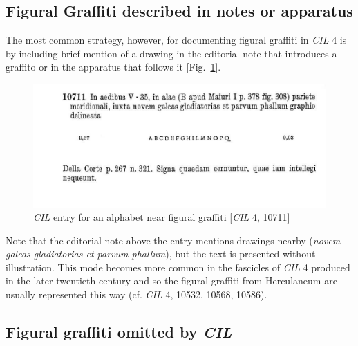 \documentclass[amsthm,ebook]{saparticle}
\begin{document}
\subsection{Figural Graffiti described in notes or apparatus}


\noindent The most common strategy, however, for documenting figural graffiti in \emph{CIL} 4 is by including brief mention of a drawing
in the editorial note that introduces a graffito or in the apparatus that follows it [Fig.~\ref{fig:3}].  



\begin{figure}[!bp]
\centering
 \includegraphics[width=\columnwidth]{EAGLE2016BenefielSypniewski-img003.jpg}
\caption{\emph{CIL} entry for an alphabet near figural graffiti [\emph{CIL} 4, 10711]}
\label{fig:3}
\end{figure}
 


Note that the editorial note above the entry mentions drawings nearby (\emph{novem galeas gladiatorias et parvum phallum}), but
the text is presented without illustration. This mode becomes more common in the fascicles of \emph{CIL} 4 produced in the
later twentieth century and so the figural graffiti from Herculaneum are usually represented this way (cf. \emph{CIL} 4,
10532, 10568, 10586). 




\subsection{Figural graffiti omitted by \emph{CIL}}
\end{document}
